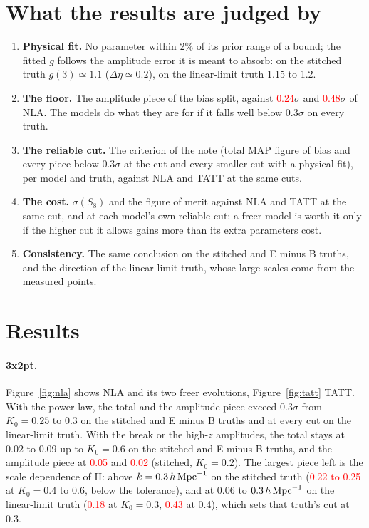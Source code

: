 \documentclass[11pt]{article}
\newcommand{\hMpc}{\,h\,{\rm Mpc}^{-1}}
\newif\ifnumbersfinal
\newcommand{\refresh}[1]{\ifnumbersfinal#1\else\textcolor{red}{#1}\fi}
\newcommand{\AmpS}{\refresh{0.24}}
\newcommand{\AmpL}{\refresh{0.48}}
\newcommand{\BkAmpS}{\refresh{0.05}}      %
\newcommand{\HzAmpS}{\refresh{0.02}}
\newcommand{\IIhiS}{\refresh{0.22 to 0.25}}  %
\newcommand{\IIlinThree}{\refresh{0.18}}  %
\newcommand{\IIlinFour}{\refresh{0.43}}   %
\newcommand{\Tol}{0.3}
\begin{document}
\section{What the results are judged by}
\begin{enumerate}
  \item \textbf{Physical fit.} No parameter within 2\% of its prior range
    of a bound; the fitted $g$ follows the amplitude error it is meant to
    absorb: on the stitched truth $g(3) \simeq 1.1$ ($\Delta\eta \simeq
    0.2$), on the linear-limit truth 1.15 to 1.2.
  \item \textbf{The floor.} The amplitude piece of the bias split, against
    \AmpS$\sigma$ and \AmpL$\sigma$ of NLA. The models do what they are for
    if it falls well below \Tol$\sigma$ on every truth.
  \item \textbf{The reliable cut.} The criterion of the note (total MAP
    figure of bias and every piece below \Tol$\sigma$ at the cut and every
    smaller cut with a physical fit), per model and truth, against NLA and
    TATT at the same cuts.
  \item \textbf{The cost.} $\sigma(S_8)$ and the figure of merit against NLA
    and TATT at the same cut, and at each model's own reliable cut: a freer
    model is worth it only if the higher cut it allows gains more than its
    extra parameters cost.
  \item \textbf{Consistency.} The same conclusion on the stitched and E minus
    B truths, and the direction of the linear-limit truth, whose large scales
    come from the measured points.
\end{enumerate}

\section{Results}
\label{sec:results}

\paragraph{3x2pt.}
Figure~\ref{fig:nla} shows NLA and its two freer evolutions, Figure~\ref{fig:tatt}
TATT. With the power law, the total and the amplitude piece exceed
\Tol$\sigma$ from $K_0 = 0.25$ to 0.3 on the stitched and E minus B truths and
at every cut on the linear-limit truth. With the break or the high-$z$
amplitudes, the total stays at 0.02 to 0.09 up to $K_0 = 0.6$ on the stitched
and E minus B truths, and the amplitude piece at \BkAmpS{} and \HzAmpS{}
(stitched, $K_0 = 0.2$). The largest piece left is the scale dependence of
II: above $k = 0.3\hMpc$ on the stitched truth (\IIhiS{} at $K_0 = 0.4$ to
0.6, below the tolerance), and at 0.06 to $0.3\hMpc$ on the linear-limit
truth (\IIlinThree{} at $K_0 = 0.3$, \IIlinFour{} at 0.4), which sets that
truth's cut at 0.3.
\end{document}
